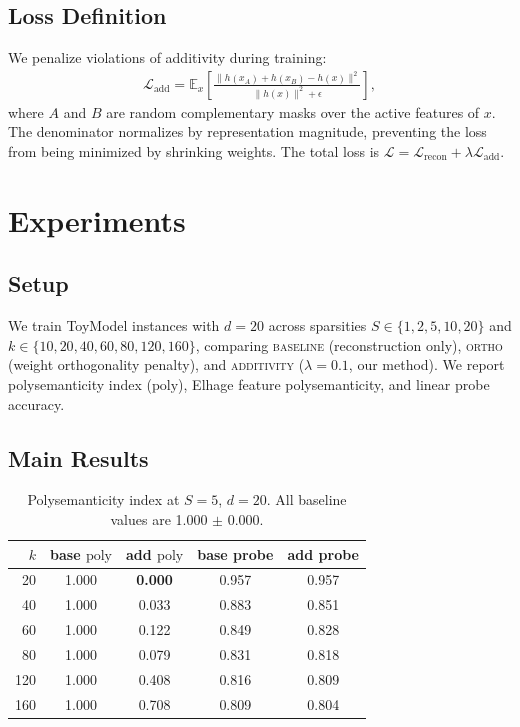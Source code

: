 \documentclass[11pt]{article}
\newcommand{\poly}{\mathrm{poly}}
\begin{document}
\subsection{Loss Definition}

We penalize violations of additivity during training:
\begin{align}
    \mathcal{L}_\mathrm{add} = \mathbb{E}_{x} \left[
        \frac{\|h(x_A) + h(x_B) - h(x)\|^2}{\|h(x)\|^2 + \epsilon}
    \right],
\end{align}
where $A$ and $B$ are random complementary masks over the active features of $x$. The
denominator normalizes by representation magnitude, preventing the loss from being minimized
by shrinking weights. The total loss is $\mathcal{L} = \mathcal{L}_\mathrm{recon} + \lambda \mathcal{L}_\mathrm{add}$.

\section{Experiments}

\subsection{Setup}

We train ToyModel instances with $d = 20$ across sparsities $S \in \{1, 2, 5, 10, 20\}$ and
$k \in \{10, 20, 40, 60, 80, 120, 160\}$, comparing \textsc{baseline} (reconstruction only),
\textsc{ortho} (weight orthogonality penalty), and \textsc{additivity} ($\lambda = 0.1$, our
method). We report polysemanticity index ($\poly$), Elhage feature polysemanticity, and
linear probe accuracy.

\subsection{Main Results}

\begin{table}[t]
\centering
\caption{Polysemanticity index at $S=5$, $d=20$.
         All baseline values are 1.000 $\pm$ 0.000.}
\label{tab:main}
\begin{tabular}{rcccc}
\toprule
$k$ & base $\poly$ & add $\poly$ & base probe & add probe \\
\midrule
20  & 1.000 & \textbf{0.000} & 0.957 & 0.957 \\
40  & 1.000 & 0.033          & 0.883 & 0.851 \\
60  & 1.000 & 0.122          & 0.849 & 0.828 \\
80  & 1.000 & 0.079          & 0.831 & 0.818 \\
120 & 1.000 & 0.408          & 0.816 & 0.809 \\
160 & 1.000 & 0.708          & 0.809 & 0.804 \\
\bottomrule
\end{tabular}
\end{table}
\end{document}
